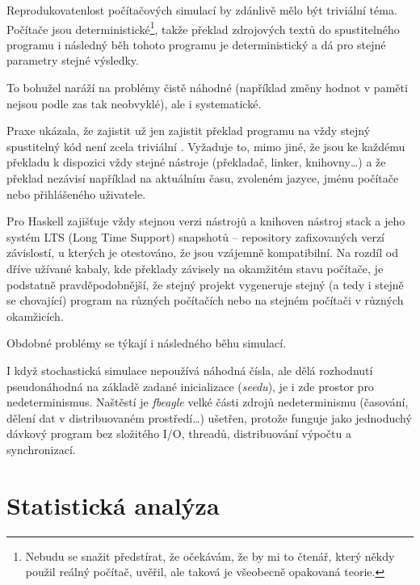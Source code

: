 \begin{tcolorbox}[ title={Reprodukovatelnost v počítačových simulacích}
                 , breakable
                 ]
Reprodukovatenlost počítačových simulací by zdánlivě mělo být triviální téma. Počítače jsou
deterministické\footnote{
Nebudu se snažit předstírat, že očekávám, že by mi to čtenář, který někdy použil reálný počítač, uvěřil, ale
taková je všeobecně opakovaná teorie.
}, takže překlad zdrojových textů do spustitelného programu i následný běh tohoto
programu je deterministický a dá pro stejné parametry stejné výsledky.

To bohužel naráží na problémy čistě náhodné (například  změny hodnot v paměti
nejsou podle \citet{schroeder2011dram} zas tak neobvyklé), ale i systematické.

Praxe ukázala, že zajistit už jen zajistit překlad programu na vždy stejný spustitelný kód není zcela triviální \citep{bobbio2014reproducibl}.
Vyžaduje to, mimo jiné, že jsou ke každému překladu k dispozici vždy stejné nástroje (překladač, linker,
knihovny\ldots) a že překlad nezávisí například na aktuálním času, zvoleném jazyce, jménu počítače nebo přihlášeného uživatele.

Pro Haskell zajišťuje vždy stejnou verzi nástrojů a knihoven nástroj stack a jeho systém
LTS (Long Time Support) snapshotů -- repository zafixovaných verzí závislostí, u kterých je
otestováno, že jsou vzájemně kompatibilní. Na rozdíl od dříve užívané kabaly, kde překlady
závisely na okamžitém stavu počítače, je podstatně pravděpodobnější, že stejný projekt vygeneruje
stejný (a tedy i stejně se chovající) program na různých počítačích nebo na stejném počítači v různých
okamžicích.

Obdobné problémy se týkají i následného běhu simulací.

I když stochastická simulace nepoužívá náhodná čísla, ale dělá rozhodnutí pseudonáhodná na základě zadané inicializace
(\textit{seedu}), je i zde prostor pro nedeterminismus. Naštěstí je \textit{fbeagle} velké části zdrojů
nedeterminismu (časování, dělení dat v distribuovaném prostředí\ldots) ušetřen, protože funguje jako
jednoduchý dávkový program bez složitého I/O, threadů, distribuování výpočtu a synchronizací.
\end{tcolorbox}


\section{Statistická analýza}

